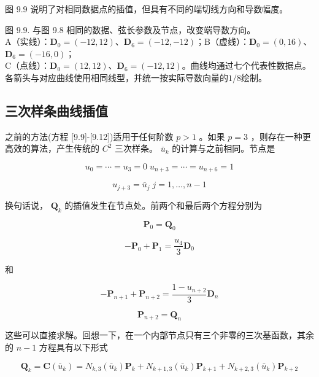 \documentclass[../main.tex]{subfiles}
\begin{document}
图 9.9 说明了对相同数据点的插值，但具有不同的端切线方向和导数幅度。


\begin{center}
\begin{minipage}{27cm}
\vspace*{.6\baselineskip}
\centering
{}
\par\smallskip
图 9.9. 与图 9.8 相同的数据、弦长参数及节点，改变端导数方向。\\
A（实线）：$\mathbf D_0=(-12,12)$、$\mathbf D_6=(-12,-12)$；B（虚线）：$\mathbf D_0=(0,16)$、$\mathbf D_6=(-16,0)$；\\
C（点线）：$\mathbf D_0=(12,12)$、$\mathbf D_6=(-12,12)$。曲线均通过七个代表性数据点。\\
各箭头与对应曲线使用相同线型，并统一按实际导数向量的$1/8$绘制。
\end{minipage}
\end{center}

\subsection{三次样条曲线插值}

之前的方法(方程 [9.9]-[9.12])适用于任何阶数 \(p > 1\) 。如果 \(p = 3\) ，则存在一种更高效的算法，产生传统的 \({C}^{2}\) 三次样条。 \({\bar{u}}_{k}\) 的计算与之前相同。节点是

\[
{u}_{0} = \cdots  = {u}_{3} = 0\;{u}_{n + 3} = \cdots  = {u}_{n + 6} = 1
\]

\[
{u}_{j + 3} = {\bar{u}}_{j}\;j = 1,\ldots ,n - 1 \tag{9.13}
\]

换句话说， \({\mathbf{Q}}_{k}\) 的插值发生在节点处。前两个和最后两个方程分别为

\[
{\mathbf{P}}_{0} = {\mathbf{Q}}_{0}
\]

\[
- {\mathbf{P}}_{0} + {\mathbf{P}}_{1} = \frac{{u}_{4}}{3}{\mathbf{D}}_{0} \tag{9.14}
\]







和

\[
- {\mathbf{P}}_{n + 1} + {\mathbf{P}}_{n + 2} = \frac{1 - {u}_{n + 2}}{3}{\mathbf{D}}_{n}
\]

\[
{\mathbf{P}}_{n + 2} = {\mathbf{Q}}_{n} \tag{9.15}
\]

这些可以直接求解。回想一下，在一个内部节点只有三个非零的三次基函数，其余的 \(n - 1\) 方程具有以下形式

\[
{\mathbf{Q}}_{k} = \mathbf{C}\left( {\bar{u}}_{k}\right)  = {N}_{k,3}\left( {\bar{u}}_{k}\right) {\mathbf{P}}_{k} + {N}_{k + 1,3}\left( {\bar{u}}_{k}\right) {\mathbf{P}}_{k + 1} + {N}_{k + 2,3}\left( {\bar{u}}_{k}\right) {\mathbf{P}}_{k + 2} \tag{9.16}
\]
\end{document}
